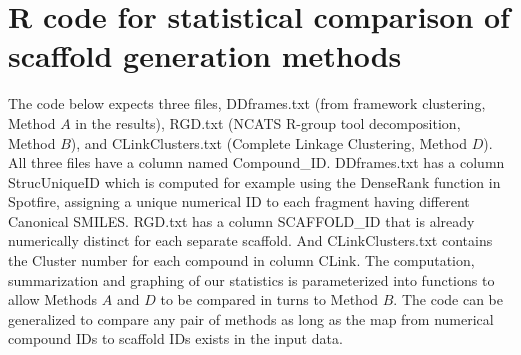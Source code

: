 \documentclass[11pt,letterpaper]{article}
\begin{document}
\newpage 

\section{R code for statistical comparison of scaffold generation methods}
\label{sec:statcode-scafcomp}

The code below expects three files, DDframes.txt (from framework clustering, Method $A$ in the results), RGD.txt (NCATS R-group tool decomposition, Method $B$), and CLinkClusters.txt (Complete Linkage Clustering, Method $D$). All three files have a column named Compound\_ID. DDframes.txt has a column StrucUniqueID which is computed for example using the DenseRank function in Spotfire, assigning a unique numerical ID to each fragment having different Canonical SMILES.  RGD.txt has a column SCAFFOLD\_ID that is already numerically distinct for each separate scaffold. And CLinkClusters.txt contains the Cluster number for each compound in column CLink. The computation, summarization and graphing of our statistics is parameterized into functions to allow Methods $A$ and $D$ to be compared in turns to Method $B$. The code can be generalized to compare any pair of methods as long as the map from numerical compound IDs to scaffold IDs exists in the input data. 
\end{document}

